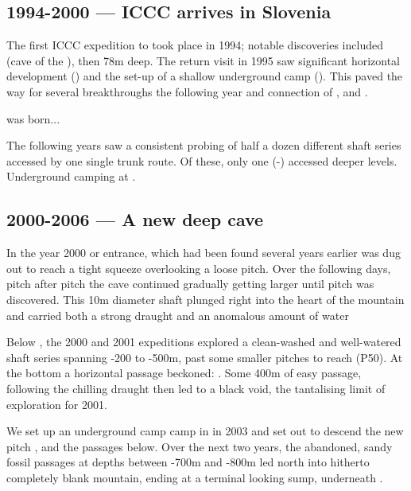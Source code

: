 \subsection{1994-2000 --- ICCC arrives in Slovenia} The first ICCC expedition to  took place in 1994; notable discoveries included  (cave of the ), then 78m deep. The return visit in 1995 saw significant horizontal development () and the set-up of a shallow underground camp (). This paved the way for several breakthroughs the following year and connection of ,  and . 

 was born...

The following years saw a consistent probing of half a dozen different shaft series accessed by one single trunk route. Of these, only one (-) accessed deeper levels. Underground camping at .

\subsection{2000-2006 --- A new deep cave} In the year 2000  or  entrance, which had been found several years earlier was dug out to reach a tight squeeze overlooking a loose pitch. Over the following days, pitch after pitch the cave continued gradually getting larger until  pitch was discovered. This 10m diameter shaft plunged right into the heart of the mountain and carried both a strong draught and an anomalous amount of water 

Below , the 2000 and 2001 expeditions explored a clean-washed and well-watered shaft series spanning -200 to -500m, past some smaller pitches to reach  (P50). At the bottom a horizontal passage beckoned: . Some 400m of easy passage, following the chilling draught then led to a black void, the tantalising limit of exploration for 2001.
    
We set up an underground camp camp in  in 2003 and set out to descend the new pitch , and the passages below. Over the next two years, the abandoned, sandy fossil passages at depths between -700m and -800m led north into hitherto completely blank mountain, ending at a terminal looking sump, underneath .

